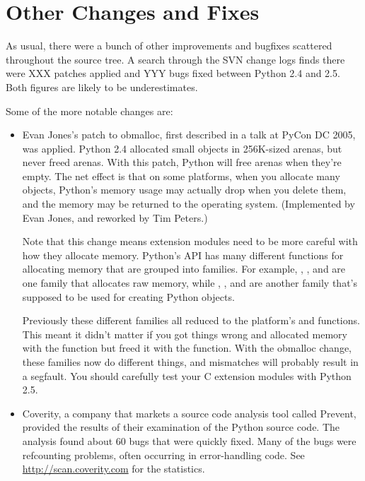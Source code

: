 \documentclass{howto}
\begin{document}
\section{Other Changes and Fixes \label{section-other}}

As usual, there were a bunch of other improvements and bugfixes
scattered throughout the source tree.  A search through the SVN change
logs finds there were XXX patches applied and YYY bugs fixed between
Python 2.4 and 2.5.  Both figures are likely to be underestimates.

Some of the more notable changes are:

\begin{itemize}

\item Evan Jones's patch to obmalloc, first described in a talk
at PyCon DC 2005, was applied.  Python 2.4 allocated small objects in
256K-sized arenas, but never freed arenas.  With this patch, Python
will free arenas when they're empty.  The net effect is that on some
platforms, when you allocate many objects, Python's memory usage may
actually drop when you delete them, and the memory may be returned to
the operating system.  (Implemented by Evan Jones, and reworked by Tim
Peters.)

Note that this change means extension modules need to be more careful
with how they allocate memory.  Python's API has many different
functions for allocating memory that are grouped into families.  For
example, , , and
 are one family that allocates raw memory,
while , ,
and  are another family that's supposed to
be used for creating Python objects.  

Previously these different families all reduced to the platform's
 and  functions.  This meant 
it didn't matter if you got things wrong and allocated memory with the
 function but freed it with the 
function.  With the obmalloc change, these families now do different
things, and mismatches will probably result in a segfault.  You should
carefully test your C extension modules with Python 2.5.

\item Coverity, a company that markets a source code analysis tool
  called Prevent, provided the results of their examination of the Python
  source code.  The analysis found about 60 bugs that 
  were quickly fixed.  Many of the bugs were refcounting problems, often
  occurring in error-handling code.  See
  \url{http://scan.coverity.com} for the statistics.

\end{itemize}
\end{document}
